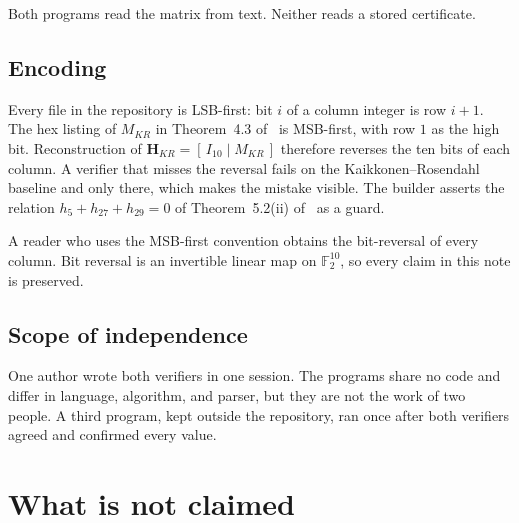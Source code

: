 \documentclass[11pt,a4paper]{article}
\newcommand{\FF}{\mathbb{F}}
\newcommand{\HH}{\boldsymbol{H}}
\theoremstyle{remark}
\begin{document}
Both programs read the matrix from text. Neither reads a stored
certificate.

\subsection{Encoding}
\label{sec:encoding}

Every file in the repository is LSB-first: bit $i$ of a column integer
is row $i+1$. The hex listing of $M_{KR}$ in Theorem~4.3
of~\cite{DMP2025} is MSB-first, with row $1$ as the high bit.
Reconstruction of $\HH_{KR}=[\,I_{10}\mid M_{KR}\,]$ therefore reverses
the ten bits of each column. A verifier that misses the reversal fails
on the Kaikkonen--Rosendahl baseline and only there, which makes the
mistake visible. The builder asserts the relation
$h_5+h_{27}+h_{29}=0$ of Theorem~5.2(ii) of~\cite{DMP2025} as a guard.

A reader who uses the MSB-first convention obtains the bit-reversal of
every column. Bit reversal is an invertible linear map on $\FF_2^{10}$,
so every claim in this note is preserved.

\subsection{Scope of independence}

One author wrote both verifiers in one session. The programs share no
code and differ in language, algorithm, and parser, but they are not
the work of two people. A third program, kept outside the repository,
ran once after both verifiers agreed and confirmed every value.

\section{What is not claimed}
\label{sec:notclaimed}
\end{document}
